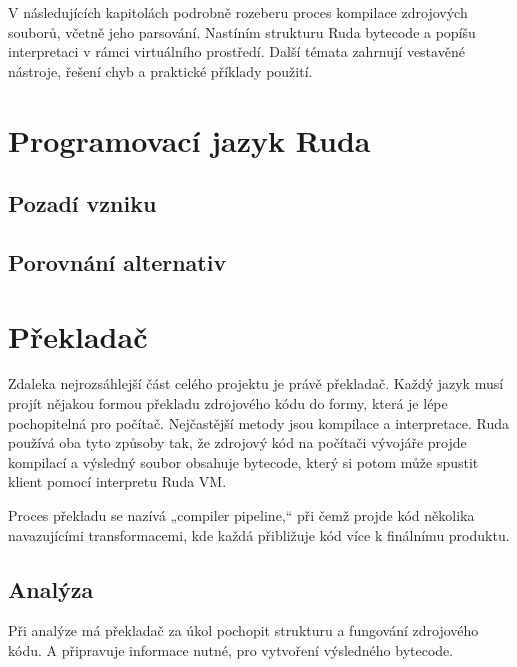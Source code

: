 \documentclass[12pt, a4paper,
twoside,        %
openright
]{report}
\begin{document}
\noindent 
V následujících kapitolách podrobně rozeberu proces kompilace zdrojových souborů, včetně jeho parsování. Nastíním strukturu Ruda bytecode a popíšu interpretaci v rámci virtuálního prostředí. Další témata zahrnují vestavěné nástroje, řešení chyb a praktické příklady použití.



\chapter{Programovací jazyk Ruda}

\section{Pozadí vzniku}

\section{Porovnání alternativ}

\chapter{Překladač}

Zdaleka nejrozsáhlejší část celého projektu je právě překladač. Každý jazyk musí projít nějakou formou překladu zdrojového kódu do formy, která je lépe pochopitelná pro počítač. Nejčastější metody jsou kompilace a interpretace. Ruda používá oba tyto způsoby tak, že zdrojový kód na počítači vývojáře projde kompilací a výsledný soubor obsahuje bytecode, který si potom může spustit klient pomocí interpretu Ruda VM.

Proces překladu se nazívá „compiler pipeline,“ při čemž projde kód několika navazujícími transformacemi, kde každá přibližuje kód více k finálnímu produktu.

\section{Analýza}

Při analýze má překladač za úkol pochopit strukturu a fungování zdrojového kódu. A připravuje informace nutné, pro vytvoření výsledného bytecode.
\end{document}
